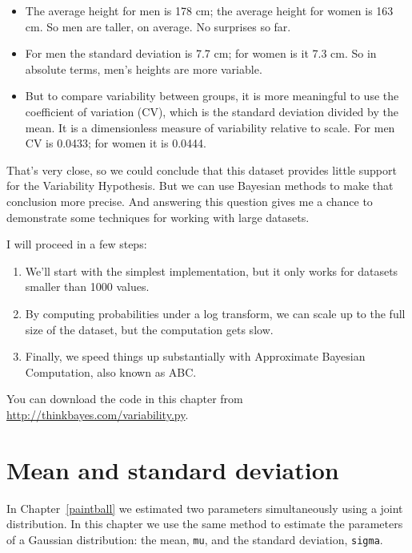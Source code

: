 \documentclass[12pt]{book}
\begin{document}
\begin{itemize}

\item The average height for men is 178 cm; the average height for
  women is 163 cm.  So men are taller, on average.  No surprises so
  far.

\item For men the standard deviation is 7.7 cm; for women is it 7.3
  cm.  So in absolute terms, men's heights are more variable.

\item But to compare variability between groups, it is more meaningful
  to use the coefficient of variation (CV), which is the standard
  deviation divided by the mean.  It is a dimensionless measure of
  variability relative to scale.  For men CV is 0.0433; for women it
  is 0.0444.

\end{itemize}

That's very close, so we could conclude that this dataset provides
little support for the Variability Hypothesis.  But we can use
Bayesian methods to make that conclusion more precise.  And answering
this question gives me a chance to demonstrate some techniques
for working with large datasets.

I will proceed in a few steps:

\begin{enumerate}

\item We'll start with the simplest implementation, but it only works
  for datasets smaller than 1000 values.

\item By computing probabilities under a log transform, we can scale
  up to the full size of the dataset, but the computation gets slow.

\item Finally, we speed things up substantially with Approximate
  Bayesian Computation, also known as ABC.

\end{enumerate}

You can download the code in this chapter from
\url{http://thinkbayes.com/variability.py}.


\section{Mean and standard deviation}

In Chapter~\ref{paintball} we estimated two parameters simultaneously
using a joint distribution.  In this chapter we use the same
method to estimate the parameters of a Gaussian distribution:
the mean, {\tt mu}, and the standard deviation, {\tt sigma}.
\end{document}
